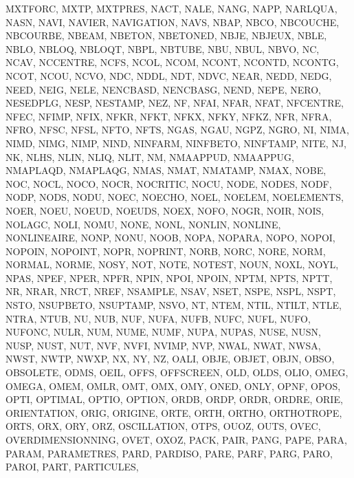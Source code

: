 {{{		MXTFORC,
		MXTP,
		MXTPRES,
		NACT,
		NALE,
		NANG,
		NAPP,
		NARLQUA,
		NASN,
		NAVI,
		NAVIER,
		NAVIGATION,
		NAVS,
		NBAP,
		NBCO,
		NBCOUCHE,
		NBCOURBE,
		NBEAM,
		NBETON,
		NBETONED,
		NBJE,
		NBJEUX,
		NBLE,
		NBLO,
		NBLOQ,
		NBLOQT,
		NBPL,
		NBTUBE,
		NBU,
		NBUL,
		NBVO,
		NC,
		NCAV,
		NCCENTRE,
		NCFS,
		NCOL,
		NCOM,
		NCONT,
		NCONTD,
		NCONTG,
		NCOT,
		NCOU,
		NCVO,
		NDC,
		NDDL,
		NDT,
		NDVC,
		NEAR,
		NEDD,
		NEDG,
		NEED,
		NEIG,
		NELE,
		NENCBASD,
		NENCBASG,
		NEND,
		NEPE,
		NERO,
		NESEDPLG,
		NESP,
		NESTAMP,
		NEZ,
		NF,
		NFAI,
		NFAR,
		NFAT,
		NFCENTRE,
		NFEC,
		NFIMP,
		NFIX,
		NFKR,
		NFKT,
		NFKX,
		NFKY,
		NFKZ,
		NFR,
		NFRA,
		NFRO,
		NFSC,
		NFSL,
		NFTO,
		NFTS,
		NGAS,
		NGAU,
		NGPZ,
		NGRO,
		NI,
		NIMA,
		NIMD,
		NIMG,
		NIMP,
		NIND,
		NINFARM,
		NINFBETO,
		NINFTAMP,
		NITE,
		NJ,
		NK,
		NLHS,
		NLIN,
		NLIQ,
		NLIT,
		NM,
		NMAAPPUD,
		NMAAPPUG,
		NMAPLAQD,
		NMAPLAQG,
		NMAS,
		NMAT,
		NMATAMP,
		NMAX,
		NOBE,
		NOC,
		NOCL,
		NOCO,
		NOCR,
		NOCRITIC,
		NOCU,
		NODE,
		NODES,
		NODF,
		NODP,
		NODS,
		NODU,
		NOEC,
		NOECHO,
		NOEL,
		NOELEM,
		NOELEMENTS,
		NOER,
		NOEU,
		NOEUD,
		NOEUDS,
		NOEX,
		NOFO,
		NOGR,
		NOIR,
		NOIS,
		NOLAGC,
		NOLI,
		NOMU,
		NONE,
		NONL,
		NONLIN,
		NONLINE,
		NONLINEAIRE,
		NONP,
		NONU,
		NOOB,
		NOPA,
		NOPARA,
		NOPO,
		NOPOI,
		NOPOIN,
		NOPOINT,
		NOPR,
		NOPRINT,
		NORB,
		NORC,
		NORE,
		NORM,
		NORMAL,
		NORME,
		NOSY,
		NOT,
		NOTE,
		NOTEST,
		NOUN,
		NOXL,
		NOYL,
		NPAS,
		NPEF,
		NPER,
		NPFR,
		NPIN,
		NPOI,
		NPOIN,
		NPTM,
		NPTS,
		NPTT,
		NR,
		NRAR,
		NRCT,
		NREF,
		NSAMPLE,
		NSAV,
		NSET,
		NSPE,
		NSPL,
		NSPT,
		NSTO,
		NSUPBETO,
		NSUPTAMP,
		NSVO,
		NT,
		NTEM,
		NTIL,
		NTILT,
		NTLE,
		NTRA,
		NTUB,
		NU,
		NUB,
		NUF,
		NUFA,
		NUFB,
		NUFC,
		NUFL,
		NUFO,
		NUFONC,
		NULR,
		NUM,
		NUME,
		NUMF,
		NUPA,
		NUPAS,
		NUSE,
		NUSN,
		NUSP,
		NUST,
		NUT,
		NVF,
		NVFI,
		NVIMP,
		NVP,
		NWAL,
		NWAT,
		NWSA,
		NWST,
		NWTP,
		NWXP,
		NX,
		NY,
		NZ,
		OALI,
		OBJE,
		OBJET,
		OBJN,
		OBSO,
		OBSOLETE,
		ODMS,
		OEIL,
		OFFS,
		OFFSCREEN,
		OLD,
		OLDS,
		OLIO,
		OMEG,
		OMEGA,
		OMEM,
		OMLR,
		OMT,
		OMX,
		OMY,
		ONED,
		ONLY,
		OPNF,
		OPOS,
		OPTI,
		OPTIMAL,
		OPTIO,
		OPTION,
		ORDB,
		ORDP,
		ORDR,
		ORDRE,
		ORIE,
		ORIENTATION,
		ORIG,
		ORIGINE,
		ORTE,
		ORTH,
		ORTHO,
		ORTHOTROPE,
		ORTS,
		ORX,
		ORY,
		ORZ,
		OSCILLATION,
		OTPS,
		OUOZ,
		OUTS,
		OVEC,
		OVERDIMENSIONNING,
		OVET,
		OXOZ,
		PACK,
		PAIR,
		PANG,
		PAPE,
		PARA,
		PARAM,
		PARAMETRES,
		PARD,
		PARDISO,
		PARE,
		PARF,
		PARG,
		PARO,
		PAROI,
		PART,
		PARTICULES,
}}}
